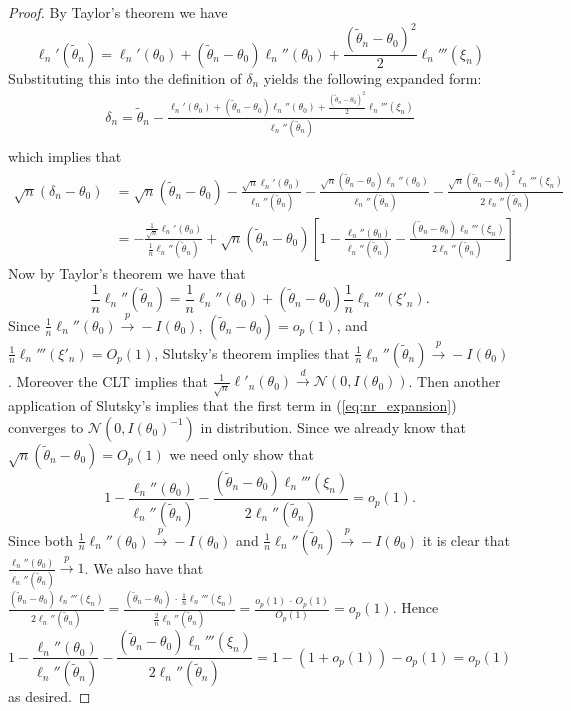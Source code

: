\begin{proof}
	By Taylor's theorem we have 
	\[
	\ell_n'(\tilde{\theta}_n) = \ell_n'(\theta_0) + (\tilde{\theta}_n - \theta_0) \ell_n''(\theta_0) + \frac{(\tilde{\theta}_n - \theta_0)^2}{2} \ell_n'''(\xi_n)
	\]
	Substituting this into the definition of $\delta_n$ yields the following expanded form:
	\begin{align*}
		\delta_n = \tilde{\theta}_n - \frac{\ell_n'(\theta_0) + (\tilde{\theta}_n - \theta_0) \ell_n''(\theta_0) + \frac{(\tilde{\theta}_n - \theta_0)^2}{2} \ell_n'''(\xi_n)}{\ell_n''(\tilde{\theta}_n)} \\
	\end{align*}
	which implies that \begin{align}
		\sqrt{n}(\delta_n - \theta_0) &= \sqrt{n} (\tilde{\theta}_n - \theta_0) - \frac{ \sqrt{n} \ell_n'(\theta_0)}{\ell_n''(\tilde{\theta}_n)} - \frac{\sqrt{n}  (\tilde{\theta}_n - \theta_0) \ell_n''(\theta_0) }{\ell_n''(\tilde{\theta}_n)}
		- \frac{\sqrt{n}  (\tilde{\theta}_n - \theta_0)^2 \ell_n'''(\xi_n) }{2\ell_n''(\tilde{\theta}_n)} \nonumber \\
		&= 
		-\frac{ \frac{1}{\sqrt{n}} \ell_n'(\theta_0)}{\frac{1}{n} \ell_n''(\tilde{\theta}_n) } 
		+ \sqrt{n} (\tilde{\theta}_n - \theta_0) \left[ 1 - \frac{\ell_n''(\theta_0) }{\ell_n''(\tilde{\theta}_n)}
		- \frac{(\tilde{\theta}_n - \theta_0) \ell_n'''(\xi_n) }{2\ell_n''(\tilde{\theta}_n)} \right] \label{eq:nr_expansion}
	\end{align}
	Now by Taylor's theorem we have that \[
		\frac{1}{n}\ell_n''(\tilde{\theta}_n) = \frac{1}{n}\ell_n''(\theta_0) + (\tilde{\theta}_n - \theta_0) \frac{1}{n} \ell_n'''(\xi'_n).
	\]
	Since $ \frac{1}{n}\ell_n''(\theta_0) \overset{p}{\to} -I(\theta_0)$, $(\tilde{\theta}_n - \theta_0) = o_p(1)$, and $\frac{1}{n} \ell_n'''(\xi'_n) = O_p(1)$, Slutsky's theorem implies that $\frac{1}{n}\ell_n''(\tilde{\theta}_n) \overset{p}{\to} -I(\theta_0)$.  Moreover the CLT implies that $\frac{1}{\sqrt{n}} \ell'_n(\theta_0) \overset{d}{\to} \mathcal N(0, I(\theta_0))$. Then another application of Slutsky's implies that the first term in (\ref{eq:nr_expansion}) converges to $\mathcal{N}(0, I(\theta_0)^{-1})$ in distribution. Since we already know that $\sqrt{n} (\tilde{\theta}_n - \theta_0) = O_p(1)$ we need only show that \[
		1 - \frac{\ell_n''(\theta_0) }{\ell_n''(\tilde{\theta}_n)}
		- \frac{(\tilde{\theta}_n - \theta_0) \ell_n'''(\xi_n) }{2\ell_n''(\tilde{\theta}_n)} = o_p(1).
	\] Since both $\frac{1}{n}\ell_n''(\theta_0) \overset{p}{\to} -I(\theta_0)$ and $\frac{1}{n}\ell_n''(\tilde{\theta}_n) \overset{p}{\to} -I(\theta_0)$ it is clear that $\frac{\ell_n''(\theta_0) }{\ell_n''(\tilde{\theta}_n)} \overset{p}{\to} 1$. We also have that $\frac{(\tilde{\theta}_n - \theta_0) \ell_n'''(\xi_n) }{2\ell_n''(\tilde{\theta}_n)} = \frac{(\tilde{\theta}_n - \theta_0) \, \cdot \, \frac{1}{n}\ell_n'''(\xi_n) }{\frac{2}{n}\ell_n''(\tilde{\theta}_n)} = \frac{o_p(1) \, \cdot \, O_p(1)}{O_p(1)} = o_p(1)$. Hence \[
		1 - \frac{\ell_n''(\theta_0) }{\ell_n''(\tilde{\theta}_n)}
		- \frac{(\tilde{\theta}_n - \theta_0) \ell_n'''(\xi_n) }{2\ell_n''(\tilde{\theta}_n)} = 1 - (1 + o_p(1)) - o_p(1) = o_p(1)
	\] as desired.
\end{proof}

